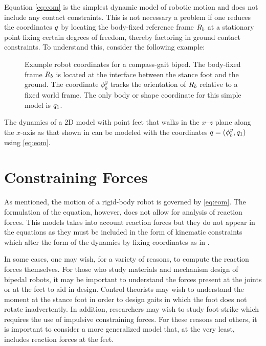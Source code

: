 Equation \eqref{eq:eom} is the simplest dynamic model of robotic motion and does
not include any contact constraints.
% 
This is not necessary a problem if one reduces the coordinates $q$ by locating
the body-fixed reference frame $R_{b}$ at a stationary point fixing certain
degrees of freedom, thereby factoring in ground contact constraints.
%
To understand this, consider the following example:

\begin{figure}[t!]
  \centering
  \def\svgwidth{.5\columnwidth}
  
  \caption[Example robot coordinates for a compass-gait biped.]{Example robot
    coordinates for a compass-gait biped.
    The body-fixed frame $R_{b}$ is located at the interface between the stance
    foot and the ground.
    The coordinate $\phi_{b}^{y}$ tracks the orientation of $R_{b}$ relative to
    a fixed world frame.
    The only body or shape coordinate for this simple model is $q_{1}$.}
    \label{fig:compass_gait_reduced_coordinates}
\end{figure}

\begin{exmp}
  \label{ex:compass_gait_reduced_coordinates}
  The dynamics of a 2D model with point feet that walks in the
  $x$--$z$ plane along the $x$-axis as that shown in
   can be modeled with the
  coordinates $q = (\phi_{b}^{y}, q_{1})$ using \eqref{eq:eom}.
\end{exmp}


\section{Constraining Forces}

As mentioned, the motion of a rigid-body robot is governed by \eqref{eq:eom}.
%
The formulation of the equation, however, does not allow for analysis of
reaction forces.
%
This models takes into account reaction forces but they do not appear in the
equations as they must be included in the form of kinematic constraints which
alter the form of the dynamics by fixing coordinates as in .

In some cases, one may wish, for a variety of reasons, to compute the reaction
forces themselves.
%
For those who study materials and mechanism design of bipedal robots, it may be
important to understand the forces present at the joints or at the feet to aid
in design.
%
Control theorists may wish to understand the moment at the stance foot in order
to design gaits in which the foot does not rotate inadvertently.
%
In addition, researchers may wish to study foot-strike which requires the use of
impulsive constraining forces.
%
For these reasons and others, it is important to consider a more generalized
model that, at the very least, includes reaction forces at the feet.

